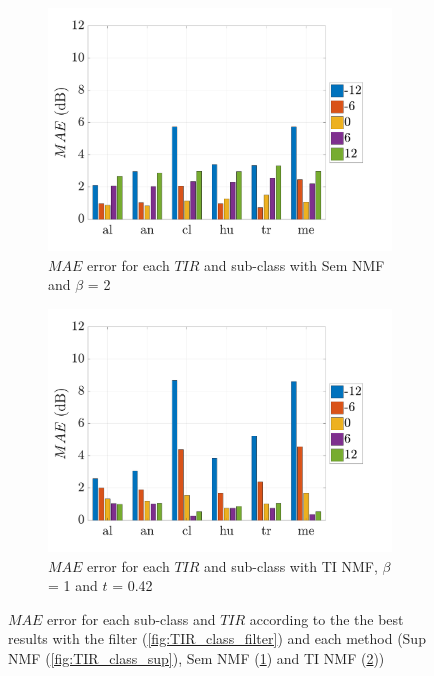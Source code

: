 \documentclass[twocolumn,a4paper,10pt]{article}
\begin{document}
\begin{figure}[t]
    \begin{subfigure}[t]{0.45\textwidth}
        \centering
      	\includegraphics[width=\linewidth]{figures/semi-sup_bar.pdf}
        \caption{$MAE$ error for each $TIR$ and sub-class with Sem NMF and $\beta$ = 2}
                \label{fig:TIR_class_semi}
    \end{subfigure}%
    \hfill
    \begin{subfigure}[t]{0.45\textwidth}
        \centering
        \includegraphics[width=\linewidth]{figures/TI_bar}
        \caption{$MAE$ error for each $TIR$ and sub-class with TI NMF, $\beta$ = 1 and $t$ = 0.42}
        \label{fig:TIR_class_TI}
    \end{subfigure}
    \caption{$MAE$ error for each sub-class and $TIR$ according to the the best results with the filter (\ref{fig:TIR_class_filter}) and each method (Sup NMF (\ref{fig:TIR_class_sup}), Sem NMF (\ref{fig:TIR_class_semi}) and TI NMF (\ref{fig:TIR_class_TI}))}
    \label{fig:TIR_bar}
\end{figure}
\end{document}
